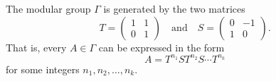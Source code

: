 The modular group $\Gamma$ is generated by the two matrices
$$T = \begin{pmatrix} 1 & 1 \\ 0 & 1 \end{pmatrix} \quad \text{and} \quad S = \begin{pmatrix} 0 & -1 \\ 1 & 0 \end{pmatrix}.$$
That is, every $A \in \Gamma$ can be expressed in the form
$$A = T^{n_1} S T^{n_2} S \cdots T^{n_k}$$
for some integers $n_1, n_2, \dots, n_k$.
